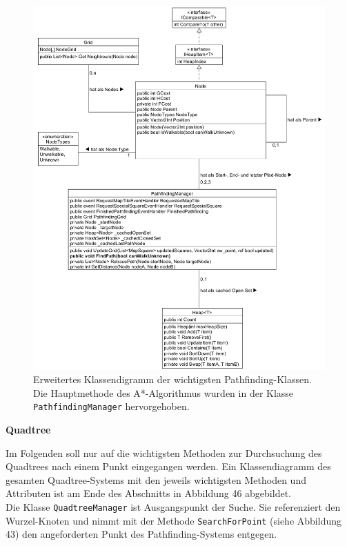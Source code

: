 \documentclass[a4paper,12pt]{article}
\newcommand{\code}{\texttt}
\begin{document}
\begin{figure}[H]
    \centering
    \includegraphics[width=1\linewidth]{Bilder/Aufgabe3/Klassendiagramm_Pathfinding.png}
    \caption{Erweitertes Klassendigramm der wichtigsten Pathfinding-Klassen. Die Hauptmethode des A*-Algorithmus wurden in der Klasse \code{PathfindingManager} hervorgehoben.}
\end{figure}

\textbf{Quadtree}

Im Folgenden soll nur auf die wichtigsten Methoden zur Durchsuchung des Quadtrees nach einem Punkt eingegangen werden. Ein Klassendiagramm des gesamten Quadtree-Systems mit den jeweils wichtigsten Methoden und Attributen ist am Ende des Abschnitts in Abbildung 46 abgebildet.
\\[0.4cm]
Die Klasse \code{QuadtreeManager} ist Ausgangspunkt der Suche. Sie referenziert den Wurzel-Knoten und nimmt mit der Methode \code{SearchForPoint} (siehe Abbildung 43) den angeforderten Punkt des Pathfinding-Systems entgegen.
\end{document}

